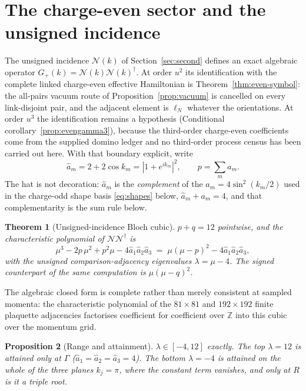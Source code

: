 \documentclass[11pt]{article}
\theoremstyle{plain}
\newtheorem{theorem}{Theorem}
\newtheorem{proposition}[theorem]{Proposition}
\theoremstyle{definition}
\theoremstyle{remark}
\newcommand{\chk}[1]{}
\newcommand{\dg}{^{\dagger}}
\begin{document}
\section{The charge-even sector and the unsigned incidence}
\label{sec:even}

The unsigned incidence $\mathcal N(k)$ of Section~\ref{sec:second} defines an
exact algebraic operator $G_+(k)=\mathcal N(k)\mathcal N(k)\dg$. At order
$u^2$ its identification with the complete linked charge-even effective
Hamiltonian is Theorem~\ref{thm:even-symbol}: the all-pairs vacuum route of
Proposition~\ref{prop:vacuum} is cancelled on every link-disjoint pair, and
the adjacent element is $\ell_N$ whatever the orientations. At order $u^3$ the
identification remains a hypothesis
(Conditional corollary~\ref{prop:evengamma3}), because the third-order
charge-even
coefficients come from the supplied domino ledger and no third-order process
census has been carried out here. With that boundary explicit, write
\[
  \hat a_m=2+2\cos k_m=|1+e^{ik_m}|^2,\qquad p=\sum_m \hat a_m .
\]
The hat is not decoration: $\hat a_m$ is the \emph{complement} of the
$a_m=4\sin^2(k_m/2)$ used in the charge-odd shape basis \eqref{eq:shapes}
below,
$\hat a_m+a_m=4$, and that complementarity is the sum rule below.

\begin{theorem}[Unsigned-incidence Bloch cubic]\label{thm:evencubic}
$p+q=12$ pointwise, and the characteristic polynomial of
$\mathcal N\mathcal N\dg$ is
\[
  \mu^3-2p\,\mu^2+p^2\mu-4\hat a_1\hat a_2\hat a_3
  \;=\;\mu(\mu-p)^2-4\hat a_1\hat a_2\hat a_3 ,
\]
with the unsigned comparison-adjacency eigenvalues $\lambda=\mu-4$. The signed
counterpart of the same computation is $\mu(\mu-q)^2$.
\end{theorem}
\chk{the unsigned-incidence characteristic polynomial is mu(mu - p)\^{}2 = 4 a\_1 a\_2 a\_3}
\chk{p + q = 12: one zone function runs both sectors}

The algebraic closed form is complete rather than merely consistent at sampled momenta:
the characteristic polynomial of the $81\times81$ and $192\times192$ finite
plaquette adjacencies factorises coefficient for coefficient over $\mathbb Z$
into this cubic over the momentum grid.
\chk{the Bloch cubic IS the finite L = 3 and L = 4 plaquette spectrum, exactly}

\begin{proposition}[Range and attainment]\label{prop:evenrange}
$\lambda\in[-4,12]$ exactly. The top $\lambda=12$ is attained only at $\Gamma$
($\hat a_1=\hat a_2=\hat a_3=4$). The bottom $\lambda=-4$ is attained on the
whole of the three planes $k_j=\pi$, where the constant term vanishes, and only
at $R$ is it a triple root.
\end{proposition}
\end{document}
